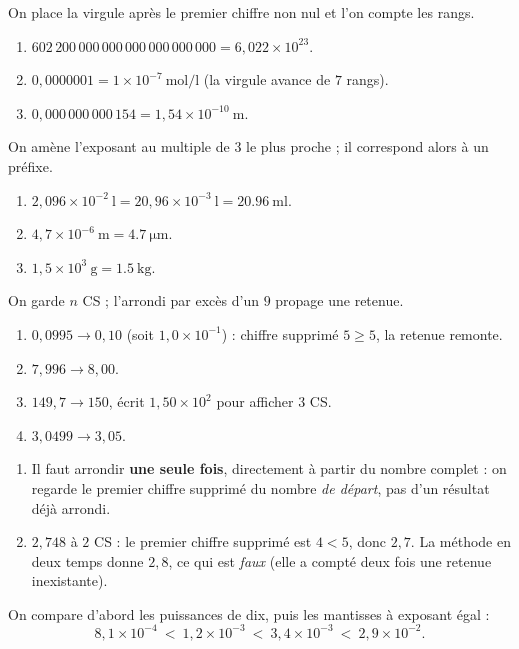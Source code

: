 \documentclass[11pt,a4paper]{article}
\begin{document}
\begin{corrige}
On place la virgule après le premier chiffre non nul et l'on compte les rangs.
\begin{enumerate}[label=\alph*)]
  \item $602\,200\,000\,000\,000\,000\,000\,000 = 6,022\times10^{23}$.
  \item $0,0000001 = 1\times10^{-7}\ \si{\mol\per\litre}$ (la virgule avance de $7$ rangs).
  \item $0,000\,000\,000\,154 = 1,54\times10^{-10}\ \si{\metre}$.
\end{enumerate}
\end{corrige}

\begin{corrige}
On amène l'exposant au multiple de $3$ le plus proche ; il correspond alors à un préfixe.
\begin{enumerate}[label=\alph*)]
  \item $2,096\times10^{-2}\ \si{\litre} = 20,96\times10^{-3}\ \si{\litre} = \qty{20,96}{\milli\litre}$.
  \item $4,7\times10^{-6}\ \si{\metre} = \qty{4,7}{\micro\metre}$.
  \item $1,5\times10^{3}\ \si{\gram} = \qty{1,5}{\kilo\gram}$.
\end{enumerate}
\end{corrige}

\begin{corrige}
On garde $n$ CS ; l'arrondi par excès d'un $9$ propage une retenue.
\begin{enumerate}[label=\alph*)]
  \item $0,0995 \to 0,10$ (soit $1,0\times10^{-1}$) : chiffre supprimé $5\ge5$, la retenue remonte.
  \item $7,996 \to 8,00$.
  \item $149,7 \to 150$, écrit $1,50\times10^{2}$ pour afficher $3$ CS.
  \item $3,0499 \to 3,05$.
\end{enumerate}
\end{corrige}

\begin{corrige}
\begin{enumerate}[label=\alph*)]
  \item Il faut arrondir \textbf{une seule fois}, directement à partir du nombre complet : on regarde le
        premier chiffre supprimé du nombre \emph{de départ}, pas d'un résultat déjà arrondi.
  \item $2,748$ à $2$ CS : le premier chiffre supprimé est $4<5$, donc $\boxed{2,7}$. La méthode en deux
        temps donne $2,8$, ce qui est \emph{faux} (elle a compté deux fois une retenue inexistante).
\end{enumerate}
\end{corrige}

\begin{corrige}
On compare d'abord les puissances de dix, puis les mantisses à exposant égal :
\[ 8,1\times10^{-4}\ <\ 1,2\times10^{-3}\ <\ 3,4\times10^{-3}\ <\ 2,9\times10^{-2}. \]
\end{corrige}
\end{document}
